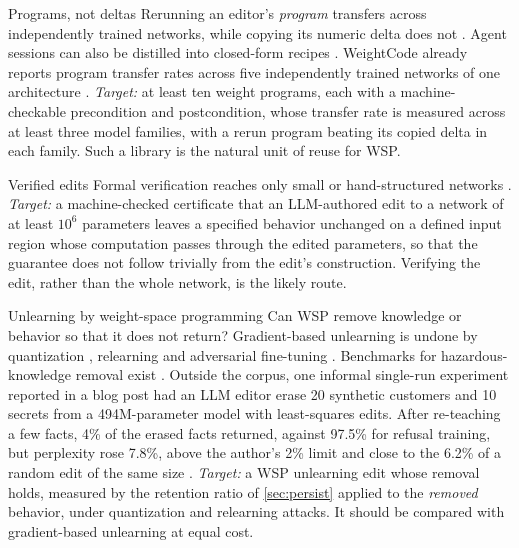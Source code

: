 \begin{openproblem}{Programs, not deltas}\label{op:program}
Rerunning an editor's \emph{program} transfers across independently trained networks, while copying its numeric delta does not \citep{ax2611_25476}. Agent sessions can also be distilled into closed-form recipes \citep{ax2611_31233,ax2611_14210}. WeightCode already reports program transfer rates across five independently trained networks of one architecture \citep{ax2611_25476}. \emph{Target:} at least ten weight programs, each with a machine-checkable precondition and postcondition, whose transfer rate is measured across at least three model families, with a rerun program beating its copied delta in each family. Such a library is the natural unit of reuse for WSP.
\end{openproblem}

\begin{openproblem}{Verified edits}\label{op:verify}
Formal verification reaches only small or hand-structured networks \citep{zen23976715,ax2611_11604,ax2611_15917}. \emph{Target:} a machine-checked certificate that an LLM-authored edit to a network of at least $10^{6}$ parameters leaves a specified behavior unchanged on a defined input region whose computation passes through the edited parameters, so that the guarantee does not follow trivially from the edit's construction. Verifying the edit, rather than the whole network, is the likely route.
\end{openproblem}

\begin{openproblem}{Unlearning by weight-space programming}\label{op:unlearn}
Can WSP remove knowledge or behavior so that it does not return? Gradient-based unlearning is undone by quantization \citep{ax2410_16454}, relearning \citep{ax2401_01814} and adversarial fine-tuning \citep{ax2409_18025}. Benchmarks for hazardous-knowledge removal exist \citep{ax2403_03218}. Outside the corpus, one informal single-run experiment reported in a blog post had an LLM editor erase 20 synthetic customers and 10 secrets from a 494M-parameter model with least-squares edits. After re-teaching a few facts, 4\% of the erased facts returned, against 97.5\% for refusal training, but perplexity rose 7.8\%, above the author's 2\% limit and close to the 6.2\% of a random edit of the same size \citep{arun2026modelsurgery}. \emph{Target:} a WSP unlearning edit whose removal holds, measured by the retention ratio of \cref{sec:persist} applied to the \emph{removed} behavior, under quantization and relearning attacks. It should be compared with gradient-based unlearning at equal cost.
\end{openproblem}

